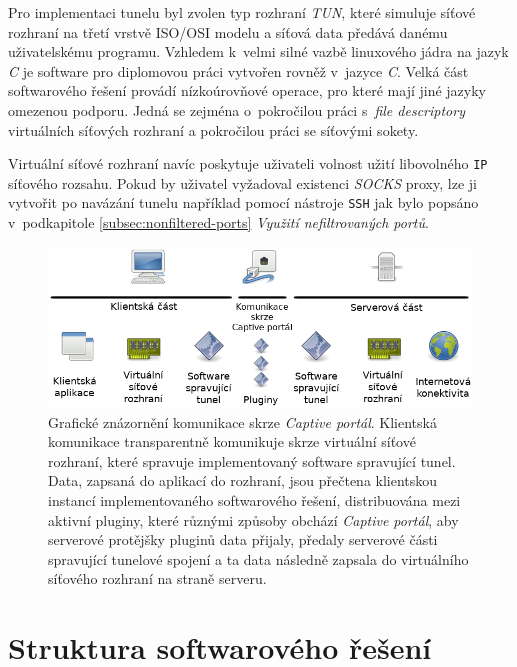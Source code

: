 \documentclass[thesis=M,czech]{FITthesis}[2012/10/20]
\begin{document}
Pro implementaci tunelu byl zvolen typ rozhraní \textit{TUN}, které simuluje síťové rozhraní na třetí vrstvě ISO/OSI modelu a síťová data předává danému uživatelskému programu. Vzhledem k~velmi silné vazbě linuxového jádra na jazyk \textit{C} je software pro diplomovou práci vytvořen rovněž v~jazyce \textit{C}. Velká část softwarového řešení provádí nízkoúrovňové operace, pro které mají jiné jazyky omezenou podporu. Jedná se zejména o~pokročilou práci s~\textit{file descriptory} virtuálních síťových rozhraní a pokročilou práci se síťovými sokety.

Virtuální síťové rozhraní navíc poskytuje uživateli volnost užití libovolného \texttt{IP} síťového rozsahu. Pokud by uživatel vyžadoval existenci \textit{SOCKS} proxy, lze ji vytvořit po navázání tunelu například pomocí nástroje \texttt{SSH} jak bylo popsáno v~podkapitole \ref{subsec:nonfiltered-ports} \textit{Využití nefiltrovaných portů}.


  \begin{figure}
  \centering
    \includegraphics[width=\textwidth]{attachments/communication_schema.png}
    \caption{Grafické znázornění komunikace skrze \textit{Captive portál}. Klientská komunikace transparentně komunikuje skrze virtuální síťové rozhraní, které spravuje implementovaný software spravující tunel. Data, zapsaná do aplikací do rozhraní, jsou přečtena klientskou instancí implementovaného softwarového řešení, distribuována mezi aktivní pluginy, které různými způsoby obchází \textit{Captive portál}, aby serverové protějšky pluginů data přijaly, předaly serverové části spravující tunelové spojení a ta data následně zapsala do virtuálního síťového rozhraní na straně serveru.}
    \label{pic:comm-schema}
  \end{figure}

\section{Struktura softwarového řešení}
\label{subsec:struktura-sw}
\end{document}

